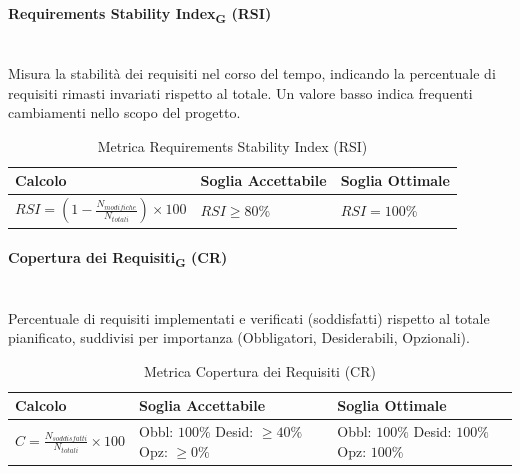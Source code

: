 \documentclass[11pt,a4paper]{article}
\begin{document}
\paragraph{Requirements Stability Index\textsubscript{G} (RSI)} \hfill \\
Misura la stabilità dei requisiti nel corso del tempo, indicando la percentuale di requisiti rimasti invariati rispetto al totale. Un valore basso indica frequenti cambiamenti nello scopo del progetto.

\begin{table}[H]
    \centering
    \renewcommand{\arraystretch}{1.5}
    \begin{tabular}{|M{0.4\textwidth}|M{0.25\textwidth}|M{0.25\textwidth}|}
        \hline
        \textbf{Calcolo} & \textbf{Soglia Accettabile} & \textbf{Soglia Ottimale} \\
        \hline
        $RSI = (1 - \frac{N_{modifiche}}{N_{totali}}) \times 100$ & $RSI \ge 80\%$ & $RSI = 100\%$ \\
        \hline
    \end{tabular}
    \caption{Metrica Requirements Stability Index (RSI)}
\end{table}

\paragraph{Copertura dei Requisiti\textsubscript{G} (CR)} \hfill \\
Percentuale di requisiti implementati e verificati (soddisfatti) rispetto al totale pianificato, suddivisi per importanza (Obbligatori, Desiderabili, Opzionali).

\begin{table}[H]
    \centering
    \renewcommand{\arraystretch}{1.5}
    \begin{tabular}{|M{0.4\textwidth}|M{0.25\textwidth}|M{0.25\textwidth}|}
        \hline
        \textbf{Calcolo} & \textbf{Soglia Accettabile} & \textbf{Soglia Ottimale} \\
        \hline
        $C = \frac{N_{soddisfatti}}{N_{totali}} \times 100$ & 
        Obbl: $100\%$ \newline Desid: $\ge 40\%$ \newline Opz: $\ge 0\%$ & 
        Obbl: $100\%$ \newline Desid: $100\%$ \newline Opz: $100\%$ \\
        \hline
    \end{tabular}
    \caption{Metrica Copertura dei Requisiti (CR)}
\end{table}
\end{document}
